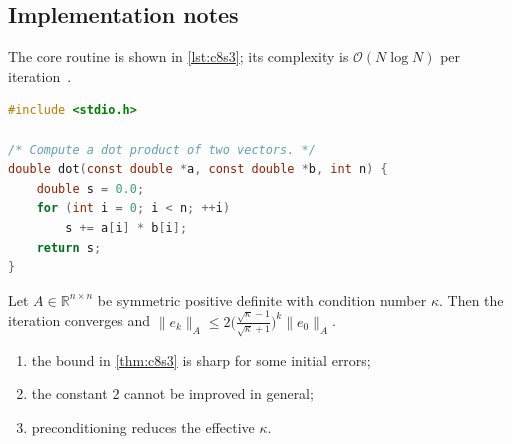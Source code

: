 \lipsum[93-94]

\subsection{Implementation notes}\label{sec:c8s3-i}
The core routine is shown in \cref{lst:c8s3}; its complexity is $\mathcal{O}(N\log N)$ per iteration~\cite{main-40}.

\begin{lstlisting}[language=c,caption={Reference implementation for c8s3.},label={lst:c8s3}]
#include <stdio.h>

/* Compute a dot product of two vectors. */
double dot(const double *a, const double *b, int n) {
    double s = 0.0;
    for (int i = 0; i < n; ++i)
        s += a[i] * b[i];
    return s;
}
\end{lstlisting}

\lipsum[60-60]
\begin{theorem}\label{thm:c8s3}
Let $A\in\mathbb{R}^{n\times n}$ be symmetric positive definite with condition number $\kappa$. Then the iteration converges and
$\lVert e_k\rVert_A \le 2\bigl(\tfrac{\sqrt\kappa-1}{\sqrt\kappa+1}\bigr)^k\lVert e_0\rVert_A$.
\end{theorem}
\begin{enumerate}[label=(\roman*)]
\item the bound in \cref{thm:c8s3} is sharp for some initial errors;
\item the constant $2$ cannot be improved in general;
\item preconditioning reduces the effective $\kappa$.
\end{enumerate}

\kant[9-11]

